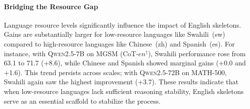 
\paragraph{Bridging the Resource Gap}

Language resource levels significantly influence the impact of English skeletons. Gains are substantially larger for low-resource languages like Swahili~(sw) compared to high-resource languages like Chinese~(zh) and Spanish~(es). For instance, with \textsc{Qwen2.5-7B} on MGSM (CoT-$en^{\dagger}$), Swahili performance rose from 63.1 to 71.7 (+8.6), while Chinese and Spanish showed marginal gains (+0.0 and +1.6). This trend persists across scales; with \textsc{Qwen2.5-72B} on MATH-500, Swahili again saw the highest improvement (+3.7). These results indicate that when low-resource languages lack sufficient reasoning stability, English skeletons serve as an essential scaffold to stabilize the process.


